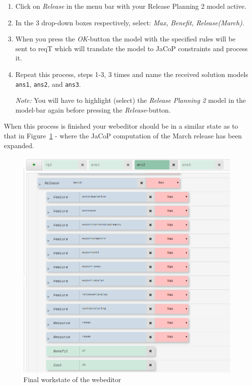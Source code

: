 \documentclass[11pt]{article}
\begin{document}
\begin{enumerate}
    \item Click on \textit{Release} in the menu bar with your Release Planning 2 model active.
    
    \item In the 3 drop-down boxes respectively, select: \textit{Max, Benefit, Release(March)}.
    
    \item When you press the \textit{OK}-button the model with the specified rules will be sent to reqT which will translate the model to JaCoP constraints and process it.\\
    
    \item Repeat this process, steps 1-3, 3 times and name the received solution models \texttt{ans1}, \texttt{ans2}, and \texttt{ans3}.
    
    \textit{Note:} You will have to highlight (select) the \textit{Release Planning 2} model in the model-bar again before pressing the \textit{Release}-button.
\end{enumerate}

When this process is finished your webeditor should be in a similar state as to that in Figure~\ref{fig:final-workstate} - where the JaCoP computation of the March release has been expanded.\\

\begin{figure}[ht]
    \centering
    \includegraphics[width=\textwidth]{final-workstate.png}
    \caption{Final workstate of the webeditor}
    \label{fig:final-workstate}
\end{figure}
\end{document}
